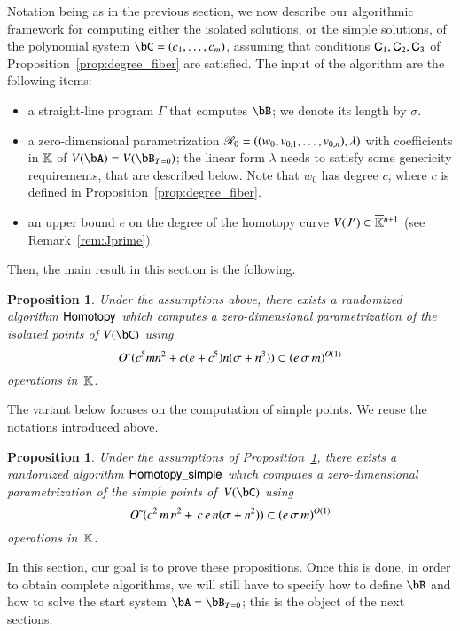 \documentclass[amsthm]{elsart}
\newtheorem{proposition}[definition]{Proposition}
\begin{document}
Notation being as in the previous section, we now describe our
algorithmic framework for computing either the isolated solutions, or
the simple solutions, of the polynomial system $\bC=(c_1,\dots,c_m)$,
assuming that conditions $\mathsf{C}_1,\mathsf{C}_2,\mathsf{C}_3$ of
Proposition~\ref{prop:degree_fiber} are satisfied. The input of the algorithm
are the following items:
\begin{itemize}
\item a straight-line program $\Gamma$ that computes $\bB$; we denote
  its length by $\sigma$.
\item a zero-dimensional parametrization $\mathscr{R}_0
  =((w_{0},v_{0,1},\dots,v_{0,n}),\lambda)$ with coefficients in $\mathbb{K}$
  of $V(\bA)=V(\bB_{T=0})$; the linear form $\lambda$ needs to satisfy some
  genericity requirements, that are described below. Note that $w_0$
  has degree $c$, where $c$ is defined in
  Proposition~\ref{prop:degree_fiber}.
\item an upper bound $e$ on the degree of the homotopy curve $V(J')
  \subset \overline{\mathbb{K}}{}^{n+1}$ (see Remark~\ref{rem:Jprime}).
\end{itemize}
Then, the main result in this section is the following.
\begin{proposition}\label{prop:compute_isolated}
  Under the assumptions above, there exists a randomized algorithm
  ${\sf Homotopy}$ which computes a zero-dimensional parametrization
  of the isolated points of $V(\bC)$ using
  $${O}{\,\tilde{ }\,}(c^5 m n^2  + c(e+c^5) n(\sigma + n^3)) \subset (e\,\sigma\,m)^{O(1)}$$
  operations in~$\mathbb{K}$. 
\end{proposition}
The variant below focuses on the computation of simple points. We
reuse the notations introduced above.
\begin{proposition}\label{prop:compute_regular}
  Under the assumptions of Proposition~\ref{prop:compute_isolated},
  there exists a randomized algorithm ${\sf Homotopy\_simple}$ which
  computes a zero-dimensional parametrization of the simple points
  of~$V(\bC)$ using
  $${O}{\,\tilde{ }\,}( c^2\, m \,n^2 + \,c\,e\,n (\sigma+n^2) )\subset (e\,\sigma\,m)^{O(1)}$$
  operations in~$\mathbb{K}$.
\end{proposition}
In this section, our goal is to prove these propositions. Once this is
done, in order to obtain complete algorithms, we will still have to
specify how to define $\bB$ and how to solve the start system
$\bA=\bB_{T=0}$; this is the object of the next sections.
\end{document}
